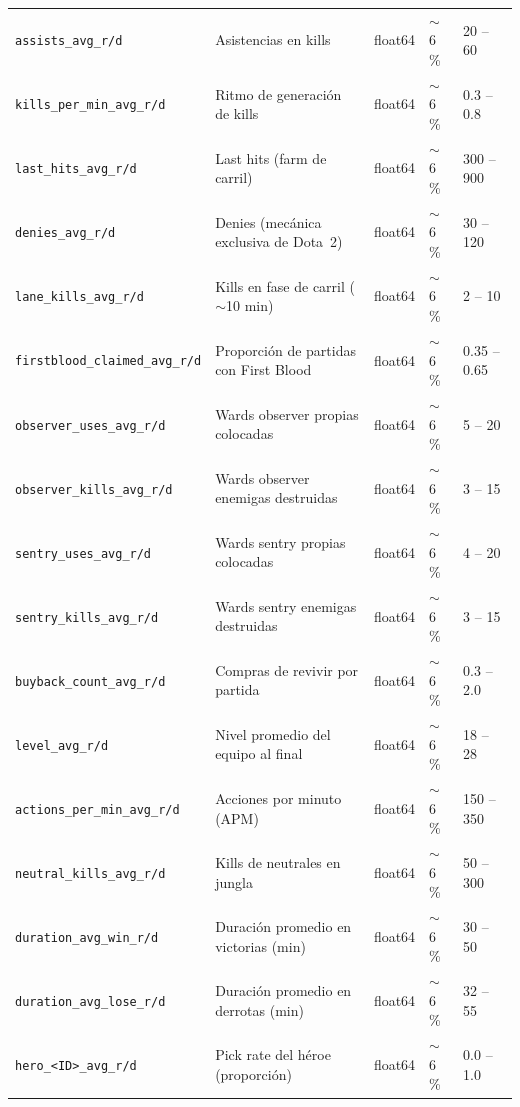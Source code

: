 \documentclass[12pt,a4paper]{article}
\begin{document}
\begin{center}
\begin{longtable}{p{4.2cm}p{3.8cm}p{1.4cm}p{1.2cm}p{2.5cm}}
  \texttt{assists\_avg\_r/d}
    & Asistencias en kills
    & float64 & $\sim$6\,\% & 20 -- 60 \\
  \texttt{kills\_per\_min\_avg\_r/d}
    & Ritmo de generaci\'on de kills
    & float64 & $\sim$6\,\% & 0.3 -- 0.8 \\
  \texttt{last\_hits\_avg\_r/d}
    & Last hits (farm de carril)
    & float64 & $\sim$6\,\% & 300 -- 900 \\
  \texttt{denies\_avg\_r/d}
    & Denies (mec\'anica exclusiva de Dota~2)
    & float64 & $\sim$6\,\% & 30 -- 120 \\
  \texttt{lane\_kills\_avg\_r/d}
    & Kills en fase de carril ($\sim$10 min)
    & float64 & $\sim$6\,\% & 2 -- 10 \\
  \texttt{firstblood\_claimed\_avg\_r/d}
    & Proporci\'on de partidas con First Blood
    & float64 & $\sim$6\,\% & 0.35 -- 0.65 \\
  \texttt{observer\_uses\_avg\_r/d}
    & Wards observer propias colocadas
    & float64 & $\sim$6\,\% & 5 -- 20 \\
  \texttt{observer\_kills\_avg\_r/d}
    & Wards observer enemigas destruidas
    & float64 & $\sim$6\,\% & 3 -- 15 \\
  \texttt{sentry\_uses\_avg\_r/d}
    & Wards sentry propias colocadas
    & float64 & $\sim$6\,\% & 4 -- 20 \\
  \texttt{sentry\_kills\_avg\_r/d}
    & Wards sentry enemigas destruidas
    & float64 & $\sim$6\,\% & 3 -- 15 \\
  \texttt{buyback\_count\_avg\_r/d}
    & Compras de revivir por partida
    & float64 & $\sim$6\,\% & 0.3 -- 2.0 \\
  \texttt{level\_avg\_r/d}
    & Nivel promedio del equipo al final
    & float64 & $\sim$6\,\% & 18 -- 28 \\
  \texttt{actions\_per\_min\_avg\_r/d}
    & Acciones por minuto (APM)
    & float64 & $\sim$6\,\% & 150 -- 350 \\
  \texttt{neutral\_kills\_avg\_r/d}
    & Kills de neutrales en jungla
    & float64 & $\sim$6\,\% & 50 -- 300 \\
  \texttt{duration\_avg\_win\_r/d}
    & Duraci\'on promedio en victorias (min)
    & float64 & $\sim$6\,\% & 30 -- 50 \\
  \texttt{duration\_avg\_lose\_r/d}
    & Duraci\'on promedio en derrotas (min)
    & float64 & $\sim$6\,\% & 32 -- 55 \\
  \texttt{hero\_<ID>\_avg\_r/d}
    & Pick rate del h\'eroe (proporci\'on)
    & float64 & $\sim$6\,\% & 0.0 -- 1.0 \\
  \bottomrule
\end{longtable}
\end{center}
\end{document}
